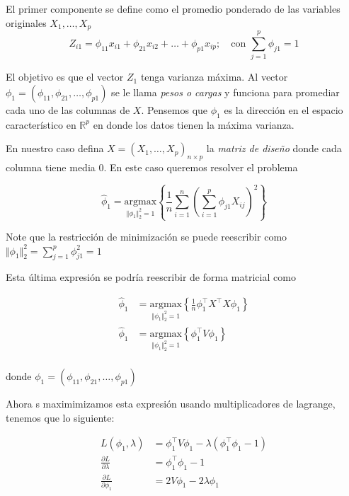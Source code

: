 \documentclass[
  12pt,
]{book}
\theoremstyle{definition}
\theoremstyle{definition}
\theoremstyle{definition}
\theoremstyle{definition}
\theoremstyle{remark}
\begin{document}
El primer componente se define como el promedio ponderado de las variables originales \(X_1, \dots, X_p\)
\begin{equation*} 
Z_{i1} = \phi_{11}x_{i1} + \phi_{21}x_{i2} + \dots + \phi_{p1}x_{ip};\quad \text{con } \sum_{j=1}^{p}\phi_{j1} = 1 
\end{equation*}

El objetivo es que el vector \(Z_1\) tenga varianza máxima. Al vector \(\phi_1 = (\phi_{11}, \phi_{21},\dots,\phi_{p1})\) se le llama \emph{pesos o cargas} y funciona para promediar cada uno de las columnas de \(X\). Pensemos que \(\phi_1\) es la dirección en el espacio característico en \(\mathbb{R}^p\) en donde los datos tienen la máxima varianza.

En nuestro caso defina \(X = (X_1,\dots,X_p)_{n\times p}\) la \emph{matriz de diseño} donde cada columna tiene media 0. En este caso queremos resolver el problema

\begin{equation*}
\hat{\phi}_1=\underset{\Vert\phi_1\Vert_2^2=1}{\mathrm{argmax}} \left\lbrace\dfrac{1}{n}\sum_{i=1}^{n}\left(\sum_{i=1}^p \phi_{j1} X_{ij} \right)^2 \right\rbrace 
\end{equation*}

Note que la restricción de minimización se puede reescribir como \(\Vert\phi_1\Vert_2^2= \sum_{j=1}^p \phi_{j1}^2 = 1\)

Esta última expresión se podría reescribir de forma matricial como

\begin{align*}
\hat{\phi}_1 &= \underset{\Vert\phi_1\Vert_2^2=1}{\mathrm{argmax}} \left\{\frac{1}{n} \phi_1^\top X^\top X \phi_1 \right\} \\
\hat{\phi}_1 &= \underset{\Vert\phi_1\Vert_2^2=1}{\mathrm{argmax}} \left\{\phi_1^\top V \phi_1 \right\} \\
\end{align*}

donde \(\phi_1 = (\phi_{11}, \phi_{21},\dots,\phi_{p1})\)

Ahora s maximimizamos esta expresión usando multiplicadores de lagrange, tenemos que lo siguiente:

\begin{align*}
L(\phi_1, \lambda) &= \phi_1^\top V \phi_1 - \lambda (\phi_1^\top \phi_1 -1) \\
\frac{\partial L}{\partial \lambda} &= \phi_1^\top \phi_1 -1 \\
\frac{\partial L}{\partial \phi_1} &= 2V\phi_1 - 2\lambda \phi_1 
\end{align*}
\end{document}

